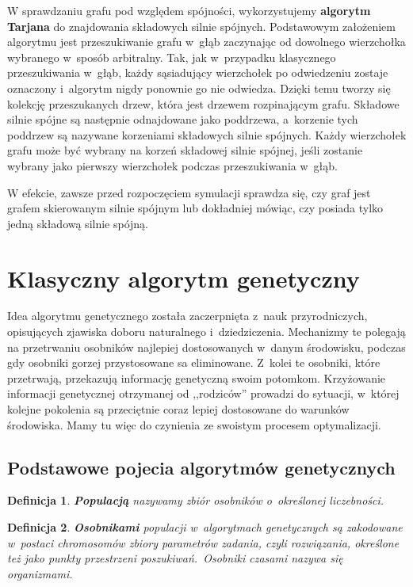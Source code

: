 \documentclass[twoside,12pt]{report}
\newtheorem{definition}{Definicja} %
\begin{document}
W sprawdzaniu grafu pod względem spójności, wykorzystujemy \textbf{algorytm Tarjana}\cite{tarjan} do znajdowania składowych silnie spójnych. Podstawowym założeniem algorytmu jest przeszukiwanie grafu w~głąb zaczynając od dowolnego wierzchołka wybranego w~sposób arbitralny. Tak, jak w~przypadku klasycznego przeszukiwania w~głąb, każdy sąsiadujący wierzchołek po odwiedzeniu zostaje oznaczony i~algorytm nigdy ponownie go nie odwiedza. Dzięki temu tworzy się kolekcję przeszukanych drzew, która jest drzewem rozpinającym grafu. Składowe silnie spójne są następnie odnajdowane jako poddrzewa, a~korzenie tych poddrzew są nazywane korzeniami składowych silnie spójnych. Każdy wierzchołek grafu może być wybrany na korzeń składowej silnie spójnej, jeśli zostanie wybrany jako pierwszy wierzchołek podczas przeszukiwania w~głąb.

W efekcie, zawsze przed rozpoczęciem symulacji sprawdza się, czy graf jest grafem skierowanym silnie spójnym lub dokładniej mówiąc, czy posiada tylko jedną składową silnie spójną.

\section{Klasyczny algorytm genetyczny}

Idea algorytmu genetycznego została zaczerpnięta z~nauk przyrodniczych, opisujących zjawiska doboru naturalnego i~dziedziczenia. Mechanizmy te polegają na
przetrwaniu osobników najlepiej dostosowanych w~danym środowisku, podczas gdy osobniki gorzej przystosowane sa eliminowane. Z~kolei te osobniki, które przetrwają, przekazują informację genetyczną swoim potomkom. Krzyżowanie informacji genetycznej otrzymanej od ,,rodziców'' prowadzi do sytuacji, w~której kolejne pokolenia są przeciętnie coraz lepiej dostosowane do warunków środowiska. Mamy tu więc do czynienia ze swoistym procesem optymalizacji. 

\subsection{Podstawowe pojecia algorytmów genetycznych}

\begin{definition}
\textbf{Populacją} nazywamy zbiór osobników o~określonej liczebności.
\end{definition}

\begin{definition}
\textbf{Osobnikami} populacji w~algorytmach genetycznych są zakodowane w~postaci chromosomów zbiory parametrów zadania, czyli rozwiązania, określone też jako punkty
przestrzeni poszukiwań.~Osobniki czasami nazywa się organizmami.
\end{definition}
\end{document}
